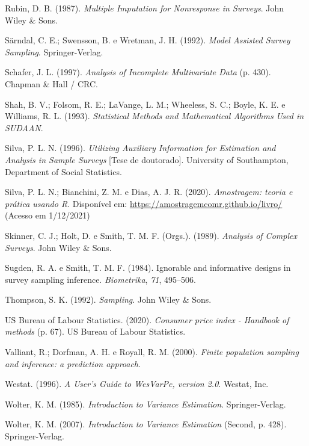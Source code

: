 \documentclass[
  12pt,
  brazilian,
]{book}
\newlength{\cslhangindent}
\newlength{\cslentryspacingunit} %
\newenvironment{CSLReferences}[2] %
 {%
  \setlength{\parindent}{0pt}
  \ifodd #1
  \let\oldpar\par
  \def\par{\hangindent=\cslhangindent\oldpar}
  \fi
  \setlength{\parskip}{#2\cslentryspacingunit}
 }%
 {}
\theoremstyle{definition}
\theoremstyle{definition}
\theoremstyle{definition}
\theoremstyle{definition}
\theoremstyle{remark}
\begin{document}
\begin{CSLReferences}{1}{0}
\leavevmode{}%
Rubin, D. B. (1987). \emph{Multiple Imputation for Nonresponse in Surveys}. John Wiley \& Sons.

\leavevmode{}%
Särndal, C. E.; Swensson, B. e Wretman, J. H. (1992). \emph{Model Assisted Survey Sampling}. Springer-Verlag.

\leavevmode{}%
Schafer, J. L. (1997). \emph{{Analysis of Incomplete Multivariate Data}} (p. 430). Chapman {\&} Hall / CRC.

\leavevmode{}%
Shah, B. V.; Folsom, R. E.; LaVange, L. M.; Wheeless, S. C.; Boyle, K. E. e Williams, R. L. (1993). \emph{Statistical Methods and Mathematical Algorithms Used in SUDAAN}.

\leavevmode{}%
Silva, P. L. N. (1996). \emph{Utilizing Auxiliary Information for Estimation and Analysis in Sample Surveys} {[}Tese de doutorado{]}. University of Southampton, Department of Social Statistics.

\leavevmode{}%
Silva, P. L. N.; Bianchini, Z. M. e Dias, A. J. R. (2020). \emph{{Amostragem: teoria e pr{á}tica usando R}}. Disponível em: \url{https://amostragemcomr.github.io/livro/} (Acesso em 1/12/2021)

\leavevmode{}%
Skinner, C. J.; Holt, D. e Smith, T. M. F. (Orgs.). (1989). \emph{Analysis of Complex Surveys}. John Wiley \& Sons.

\leavevmode{}%
Sugden, R. A. e Smith, T. M. F. (1984). Ignorable and informative designs in survey sampling inference. \emph{Biometrika}, \emph{71}, 495--506.

\leavevmode{}%
Thompson, S. K. (1992). \emph{Sampling}. John Wiley \& Sons.

\leavevmode{}%
US Bureau of Labour Statistics. (2020). \emph{{Consumer price index - Handbook of methods}} (p. 67). US Bureau of Labour Statistics.

\leavevmode{}%
Valliant, R.; Dorfman, A. H. e Royall, R. M. (2000). \emph{Finite population sampling and inference: a prediction approach}.

\leavevmode{}%
Westat. (1996). \emph{A User's Guide to {WesVarPc}, version 2.0}. Westat, Inc.

\leavevmode{}%
Wolter, K. M. (1985). \emph{Introduction to Variance Estimation}. Springer-Verlag.

\leavevmode{}%
Wolter, K. M. (2007). \emph{Introduction to Variance Estimation} (Second, p. 428). Springer-Verlag.

\end{CSLReferences}
\end{document}
